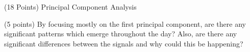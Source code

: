 \documentclass[12pt]{article}
\begin{document}
\begin{question}{(18 Points) Principal Component Analysis}
\begin{subquestion}



\end{subquestion}

\begin{subquestion}{(5 points) By focusing mostly on the first principal component, are there any significant patterns which emerge throughout the day?  Also, are there any significant differences between the signals and why could this be happening? }






\end{subquestion}

\end{question}

\end{document}
